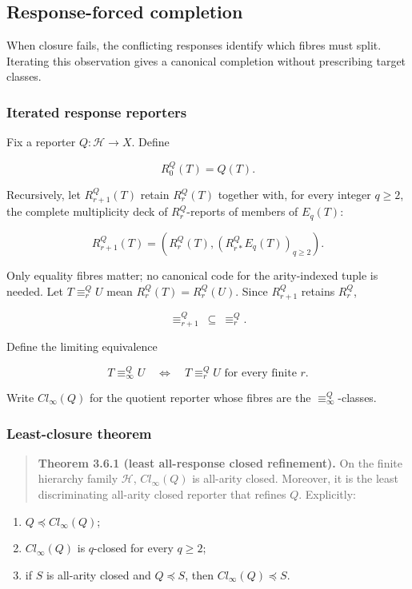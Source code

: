 \documentclass[11pt,a4paper]{article}
\begin{document}
\subsection{Response-forced
completion}

When closure fails, the conflicting responses identify which fibres must
split. Iterating this observation gives a canonical completion without
prescribing target classes.

\subsubsection{Iterated response
reporters}

Fix a reporter \(Q:\mathcal{H} \rightarrow X\). Define

\[R_{0}^{Q}(T) = Q(T).\]

Recursively, let \(R_{r + 1}^{Q}(T)\) retain \(R_{r}^{Q}(T)\) together
with, for every integer \(q \geq 2\), the complete multiplicity deck of
\(R_{r}^{Q}\)-reports of members of \(E_{q}(T)\):

\[R_{r + 1}^{Q}(T) = \left( R_{r}^{Q}(T),(R_{r*}^{Q}E_{q}(T))_{q \geq 2} \right).\]

Only equality fibres matter; no canonical code for the arity-indexed
tuple is needed. Let \(T \equiv_{r}^{Q}U\) mean
\(R_{r}^{Q}(T) = R_{r}^{Q}(U)\). Since \(R_{r + 1}^{Q}\) retains
\(R_{r}^{Q}\),

\[\equiv_{r + 1}^{Q}\  \subseteq \  \equiv_{r}^{Q}.\]

Define the limiting equivalence

\[T \equiv_{\infty}^{Q}U\quad \Leftrightarrow \quad T \equiv_{r}^{Q}U\text{ for every finite }r.\]

Write \({Cl}_{\infty}(Q)\) for the quotient reporter whose fibres are
the \(\equiv_{\infty}^{Q}\)-classes.

\subsubsection{Least-closure theorem}

\begin{quote}
\textbf{Theorem 3.6.1 (least all-response closed refinement).} On the
finite hierarchy family \(\mathcal{H}\), \({Cl}_{\infty}(Q)\) is
all-arity closed. Moreover, it is the least discriminating all-arity
closed reporter that refines \(Q\). Explicitly:
\end{quote}

\begin{enumerate}
\def\labelenumi{\arabic{enumi}.}
\tightlist
\item
  \(Q \preccurlyeq {Cl}_{\infty}(Q)\);
\item
  \({Cl}_{\infty}(Q)\) is \(q\)-closed for every \(q \geq 2\);
\item
  if \(S\) is all-arity closed and \(Q \preccurlyeq S\), then
  \({Cl}_{\infty}(Q) \preccurlyeq S\).
\end{enumerate}
\end{document}
